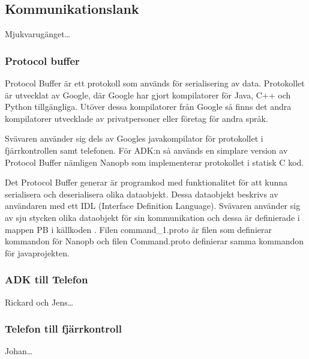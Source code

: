 \subsection{Kommunikationslank}
Mjukvarugänget\ldots
\subsubsection{Protocol buffer}
Protocol Buffer\cite{Protocol buffer} är ett protokoll som används för
serialisering av data.
Protokollet är utvecklat av Google, där Google har gjort kompilatorer för Java,
C++ och Python tillgängliga. Utöver dessa kompilatorer från Google så finns det
andra kompilatorer utvecklade av privatpersoner eller företag för andra språk.

Svävaren använder sig dels av Googles javakompilator för protokollet i 
fjärrkontrollen samt telefonen. För ADK:n så används en simplare version av
Protocol Buffer nämligen Nanopb \cite{Nanopb} som implementerar protokollet i
statisk C kod.

Det Protocol Buffer generar är programkod med funktionalitet för att kunna
serialisera och deserialisera olika dataobjekt. Dessa dataobjekt beskrivs av
användaren med ett IDL (Interface Definition Language).
Svävaren använder sig av sju stycken olika dataobjekt för sin kommunikation och
dessa är definierade i mappen PB i källkoden \cite{Source code}. Filen
command\_1.proto är filen som definierar kommandon för Nanopb och filen
Command.proto definierar samma kommandon för javaprojekten.

\subsubsection{ADK till Telefon}
Rickard och Jens\ldots
\subsubsection{Telefon till fjärrkontroll}
Johan\ldots
